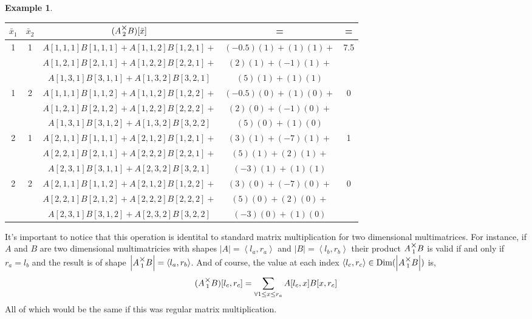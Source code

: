 \documentclass[12pt]{book}
\theoremstyle{plain}
\theoremstyle{definition}
\newtheorem{example}{Example}[chapter]
\theoremstyle{ppart}
\theoremstyle{case}
\theoremstyle{solution}
\DeclareMathOperator{\Dim}{Dim}
\newcommand{\mmult}[1]{\text{\raisebox{1ex}{$\underset{#1}{\times}$}}}
\newcommand{\shape}[1]{\left|#1\right|}
\begin{document}
\begin{example}
\begin{table}[h!]
\begin{center}
\begin{tabular}{c c | c | c | c}
$\bar{x}_1$ & $\bar{x}_2$ & $(A \mmult{2} B)[\bar{x}]$ & = & = \\
\hline
1 & 1 &
  $A[1,1,1]B[1,1,1] + A[1,1,2]B[1,2,1] +$ & $(-0.5)(1) + (1)(1) +$ & 7.5 \\
&&$A[1,2,1]B[2,1,1] + A[1,2,2]B[2,2,1] +$ & $(2)(1) + (-1)(1) +$ & \\
&&$A[1,3,1]B[3,1,1] + A[1,3,2]B[3,2,1]$   & $(5)(1) + (1)(1)$ & \\
1 & 2 &
  $A[1,1,1]B[1,1,2] + A[1,1,2]B[1,2,2] +$ & $(-0.5)(0) + (1)(0) +$ & 0 \\
&&$A[1,2,1]B[2,1,2] + A[1,2,2]B[2,2,2] +$ & $(2)(0) + (-1)(0) +$ & \\
&&$A[1,3,1]B[3,1,2] + A[1,3,2]B[3,2,2]$   & $(5)(0) + (1)(0)$ & \\
2 & 1 &
  $A[2,1,1]B[1,1,1] + A[2,1,2]B[1,2,1] +$ & $(3)(1) + (-7)(1) +$ & 1 \\
&&$A[2,2,1]B[2,1,1] + A[2,2,2]B[2,2,1] +$ & $(5)(1) + (2)(1) +$ & \\
&&$A[2,3,1]B[3,1,1] + A[2,3,2]B[3,2,1]$   & $(-3)(1) + (1)(1)$ & \\
2 & 2 &
  $A[2,1,1]B[1,1,2] + A[2,1,2]B[1,2,2] +$ & $(3)(0) + (-7)(0) +$ & 0 \\
&&$A[2,2,1]B[2,1,2] + A[2,2,2]B[2,2,2] +$ & $(5)(0) + (2)(0) +$ & \\
&&$A[2,3,1]B[3,1,2] + A[2,3,2]B[3,2,2]$   & $(-3)(0) + (1)(0)$ &
\end{tabular}
\end{center}
\end{table}

\end{example}
\newpage

It's important to notice that this operation is identital to standard
matrix multiplication for two dimensional multimatrices. For instance,
if $A$ and $B$ are two dimensional multimatricies with shapes
$\shape{A} = \left<l_a, r_a\right>$ and $\shape{B} = \left<l_b, r_b\right>$
their product $A \mmult{1} B$ is valid if and only if $r_a = l_b$ and
the result is of shape $\shape{A \mmult{1} B} = \left<l_a, r_b\right>$.
And of course, the value at each index
$\left<l_c, r_c\right> \in \Dim(\shape{A \mmult{1} B})$ is,
\[
  (A \mmult{1} B)[l_c, r_c]
  =
  \sum_{\forall 1 \le x \le r_a} 
  A[l_c, x] B[x, r_c]
\]
All of which would be the same if this was regular matrix multiplication.
\end{document}
